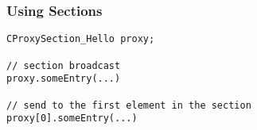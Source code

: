 \begin{frame}[fragile]
\frametitle{Using Sections}
\begin{lstlisting}
CProxySection_Hello proxy;

// section broadcast
proxy.someEntry(...) 

// send to the first element in the section
proxy[0].someEntry(...) 
\end{lstlisting}
\end{frame}




